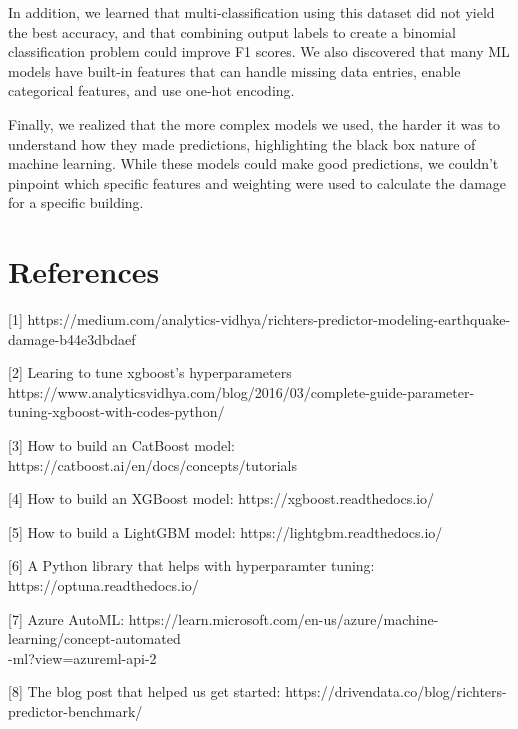 \documentclass{article}
\begin{document}
In addition, we learned that multi-classification using this dataset did not yield the best accuracy, and that combining output labels to create a binomial classification problem could improve F1 scores.
We also discovered that many ML models have built-in features that can handle missing data entries, enable categorical features, and use one-hot encoding. 

Finally, we realized that the more complex models we used, the harder it was to understand how they made predictions, highlighting the black box nature of machine learning.
While these models could make good predictions, we couldn't pinpoint which specific features and weighting were used to calculate the damage for a specific building.

\section*{References}

{
\small

[1] https://medium.com/analytics-vidhya/richters-predictor-modeling-earthquake-damage-b44e3dbdaef

[2] Learing to tune xgboost's hyperparameters https://www.analyticsvidhya.com/blog/2016/03/complete-guide-parameter-tuning-xgboost-with-codes-python/

[3] How to build an CatBoost model: https://catboost.ai/en/docs/concepts/tutorials

[4] How to build an XGBoost model: https://xgboost.readthedocs.io/

[5] How to build a LightGBM model: https://lightgbm.readthedocs.io/

[6] A Python library that helps with hyperparamter tuning: https://optuna.readthedocs.io/

[7] Azure AutoML: https://learn.microsoft.com/en-us/azure/machine-learning/concept-automated\\-ml?view=azureml-api-2

[8] The blog post that helped us get started: https://drivendata.co/blog/richters-predictor-benchmark/

}
\end{document}
